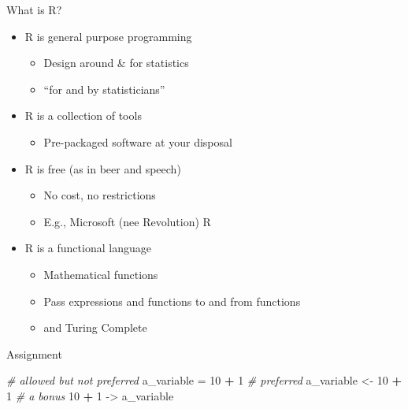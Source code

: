 \documentclass[
  ignorenonframetext,
]{beamer}
\newenvironment{Shaded}{\begin{snugshade}}{\end{snugshade}}
\newcommand{\CommentTok}[1]{\textcolor[rgb]{0.56,0.35,0.01}{\textit{#1}}}
\newcommand{\DecValTok}[1]{\textcolor[rgb]{0.00,0.00,0.81}{#1}}
\newcommand{\NormalTok}[1]{#1}
\newcommand{\OperatorTok}[1]{\textcolor[rgb]{0.81,0.36,0.00}{\textbf{#1}}}
\newcommand{\StringTok}[1]{\textcolor[rgb]{0.31,0.60,0.02}{#1}}
\providecommand{\tightlist}{%
  \setlength{\itemsep}{0pt}\setlength{\parskip}{0pt}}
\begin{document}
\begin{frame}{What is R?}
\protect\hypertarget{what-is-r}{}

\begin{itemize}[<+->]
\tightlist
\item
  R is general purpose programming

  \begin{itemize}[<+->]
  \tightlist
  \item
    Design around \& for statistics
  \item
    ``for and by statisticians''
  \end{itemize}
\item
  R is a collection of tools

  \begin{itemize}[<+->]
  \tightlist
  \item
    Pre-packaged software at your disposal
  \end{itemize}
\item
  R is free (as in beer and speech)

  \begin{itemize}[<+->]
  \tightlist
  \item
    No cost, no restrictions
  \item
    E.g., Microsoft (nee Revolution) R
  \end{itemize}
\item
  R is a functional language

  \begin{itemize}[<+->]
  \tightlist
  \item
    Mathematical functions
  \item
    Pass expressions and functions to and from functions
  \item
    and Turing Complete
  \end{itemize}
\end{itemize}

\end{frame}

\begin{frame}[fragile]{Assignment}
\protect\hypertarget{assignment}{}

\begin{Shaded}
\begin{Highlighting}[]
\CommentTok{# allowed but not preferred}
\NormalTok{a_variable =}\StringTok{ }\DecValTok{10} \OperatorTok{+}\StringTok{ }\DecValTok{1}
\CommentTok{# preferred}
\NormalTok{a_variable <-}\StringTok{ }\DecValTok{10} \OperatorTok{+}\StringTok{ }\DecValTok{1}
\CommentTok{# a bonus}
\DecValTok{10} \OperatorTok{+}\StringTok{ }\DecValTok{1}\NormalTok{ ->}\StringTok{ }\NormalTok{a_variable}
\end{Highlighting}
\end{Shaded}

\end{frame}
\end{document}
